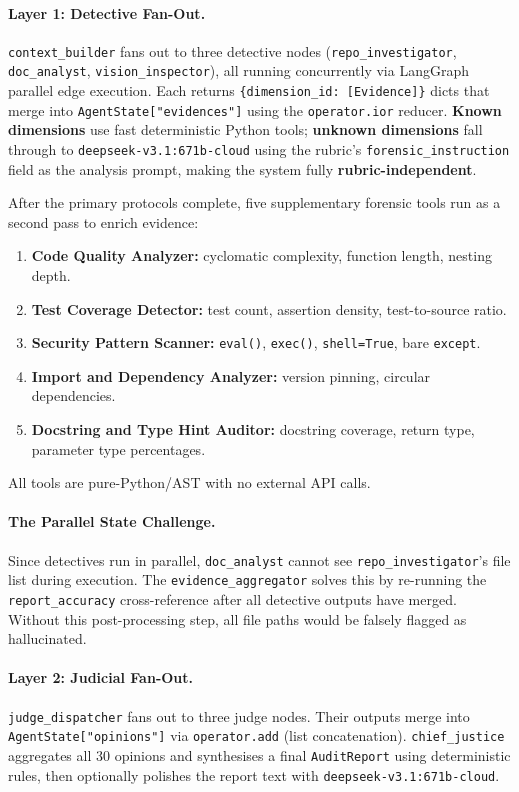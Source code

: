 \documentclass[11pt,a4paper]{article}
\begin{document}
\paragraph{Layer 1: Detective Fan-Out.}
\texttt{context\_builder} fans out to three detective nodes
(\texttt{repo\_investigator}, \texttt{doc\_analyst}, \texttt{vision\_inspector}),
all running concurrently via LangGraph parallel edge execution.  Each returns
\texttt{\{dimension\_id: [Evidence]\}} dicts that merge into
\texttt{AgentState["evidences"]} using the \texttt{operator.ior} reducer.
\textbf{Known dimensions} use fast deterministic Python tools; \textbf{unknown
dimensions} fall through to \texttt{deepseek-v3.1:671b-cloud} using the rubric's
\texttt{forensic\_instruction} field as the analysis prompt, making the system
fully \textbf{rubric-independent}.

After the primary protocols complete, five supplementary forensic tools
run as a second pass to enrich evidence:
\begin{enumerate}
    \item \textbf{Code Quality Analyzer:} cyclomatic complexity, function length, nesting depth.
    \item \textbf{Test Coverage Detector:} test count, assertion density, test-to-source ratio.
    \item \textbf{Security Pattern Scanner:} \texttt{eval()}, \texttt{exec()}, \texttt{shell=True}, bare \texttt{except}.
    \item \textbf{Import and Dependency Analyzer:} version pinning, circular dependencies.
    \item \textbf{Docstring and Type Hint Auditor:} docstring coverage, return type, parameter type percentages.
\end{enumerate}
All tools are pure-Python/AST with no external API calls.

\paragraph{The Parallel State Challenge.}
Since detectives run in parallel, \texttt{doc\_analyst} cannot see
\texttt{repo\_investigator}'s file list during execution.  The
\texttt{evidence\_aggregator} solves this by re-running the
\texttt{report\_accuracy} cross-reference after all detective outputs have merged.
Without this post-processing step, all file paths would be falsely flagged
as hallucinated.

\paragraph{Layer 2: Judicial Fan-Out.}
\texttt{judge\_dispatcher} fans out to three judge nodes.  Their
outputs merge into \texttt{AgentState["opinions"]} via \texttt{operator.add}
(list concatenation).  \texttt{chief\_justice} aggregates all 30 opinions
and synthesises a final \texttt{AuditReport} using deterministic rules, then
optionally polishes the report text with \texttt{deepseek-v3.1:671b-cloud}.
\end{document}
